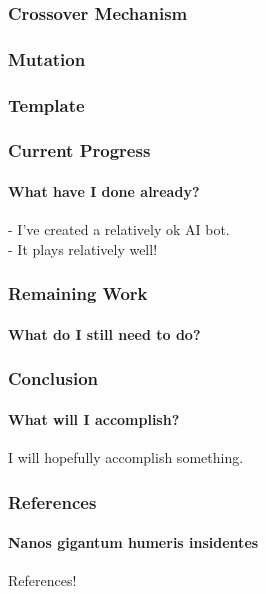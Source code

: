 \documentclass{beamer}
\begin{document}

\begin{frame}
\end{frame}


\begin{frame}
	\frametitle{Crossover Mechanism}
\end{frame}

\begin{frame}
	\frametitle{Mutation}
\end{frame}

\begin{frame}
	\frametitle{Template}
\end{frame}

\begin{frame}
	\frametitle{Current Progress}
	\framesubtitle{What have I done already?}

	- I've created a relatively ok AI bot. \\
	- It plays relatively well! \\

\end{frame}

\begin{frame}
	\frametitle{Remaining Work}
	\framesubtitle{What do I still need to do?}
\end{frame}

\begin{frame}
	\frametitle{Conclusion}
	\framesubtitle{What will I accomplish?}
	I will hopefully accomplish something.
\end{frame}

\begin{frame}
	\frametitle{References}
	\framesubtitle{Nanos gigantum humeris insidentes}
	References!
\end{frame}
\end{document}
